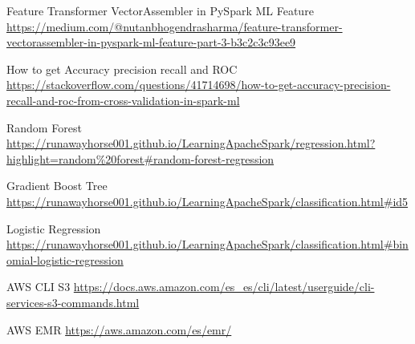 

\begin{thebibliography}{X}

    Feature Transformer VectorAssembler in PySpark ML Feature 
    \url{https://medium.com/@nutanbhogendrasharma/feature-transformer-vectorassembler-in-pyspark-ml-feature-part-3-b3c2c3c93ee9}
    
    How to get Accuracy precision recall and ROC
    \url{https://stackoverflow.com/questions/41714698/how-to-get-accuracy-precision-recall-and-roc-from-cross-validation-in-spark-ml}
    
    Random Forest
    \url{https://runawayhorse001.github.io/LearningApacheSpark/regression.html?highlight=random%20forest#random-forest-regression}
    
    
    Gradient Boost Tree
    \url{https://runawayhorse001.github.io/LearningApacheSpark/classification.html#id5}
    
    
    Logistic Regression
    \url{https://runawayhorse001.github.io/LearningApacheSpark/classification.html#binomial-logistic-regression}
    
    AWS CLI S3
    \url{https://docs.aws.amazon.com/es_es/cli/latest/userguide/cli-services-s3-commands.html}
    
    
    AWS EMR
    \url{https://aws.amazon.com/es/emr/}
    
    

    
    
    
    
    
    
\end{thebibliography}